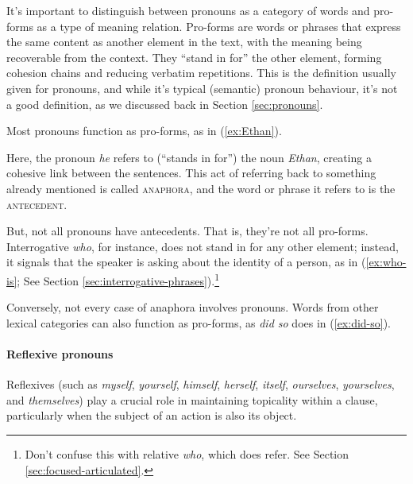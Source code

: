 It's important to distinguish between pronouns as a category of words and pro-forms as a type of meaning relation. Pro-forms are words or phrases that express the same content as another element in the text, with the meaning being recoverable from the context. They ``stand in for'' the other element, forming cohesion chains and reducing verbatim repetitions. This is the definition usually given for pronouns, and while it's typical (semantic) pronoun behaviour, it's not a good definition, as we discussed back in Section \ref{sec:pronouns}.

Most pronouns function as pro-forms, as in (\ref{ex:Ethan}).

 \label{ex:Ethan}
\z

Here, the pronoun \textit{he} refers to (``stands in for'') the noun \textit{Ethan}, creating a cohesive link between the sentences. This act of referring back to something already mentioned is called \textsc{anaphora}, and the word or phrase it refers to is the \textsc{antecedent}.

But, not all pronouns have antecedents. That is, they're not all pro-forms. Interrogative \textit{who}, for instance, does not stand in for any other element; instead, it signals that the speaker is asking about the identity of a person, as in (\ref{ex:who-is}; See Section \ref{sec:interrogative-phrases}).\footnote{Don't confuse this with relative \textit{who}, which does refer. See Section \ref{sec:focused-articulated}.}

\label{ex:who-is}
\z

Conversely, not every case of anaphora involves pronouns. Words from other lexical categories can also function as pro-forms, as \textit{did so} does in (\ref{ex:did-so}).

\label{ex:did-so}
\z
{}

\paragraph*{Reflexive pronouns} Reflexives (such as \textit{myself}, \textit{yourself}, \textit{himself}, \textit{herself}, \textit{itself}, \textit{ourselves}, \textit{yourselves}, and \textit{themselves}) play a crucial role in maintaining topicality within a clause, particularly when the subject of an action is also its object.

